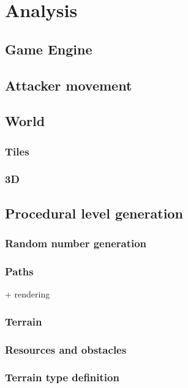 \chapter{Analysis}

\section{Game Engine}

\section{Attacker movement}

\section{World}

\subsection{Tiles}

\subsection{3D}

\section{Procedural level generation}

\subsection{Random number generation}

\subsection{Paths}
+ rendering
\subsection{Terrain}

\subsection{Resources and obstacles}

\subsection{Terrain type definition}

